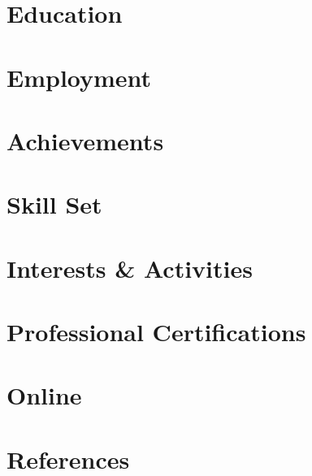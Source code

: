 \documentclass[10pt,a4paper]{article}
\begin{document}

\vspace{5mm}

\section*{Education}
    
    \vspace{5mm}

\section*{Employment}
    
    \vspace{5mm}
    
\section*{Achievements}
    

\clearpage
    
\section*{Skill Set}
    
    \vspace{5mm}
    
\section*{Interests \& Activities}
    
    \vspace{5mm}
    
\section*{Professional Certifications}
    
    \vspace{5mm}
    
\section*{Online}
    
    \vspace{5mm}
    
\section*{References}
    
\end{document}
